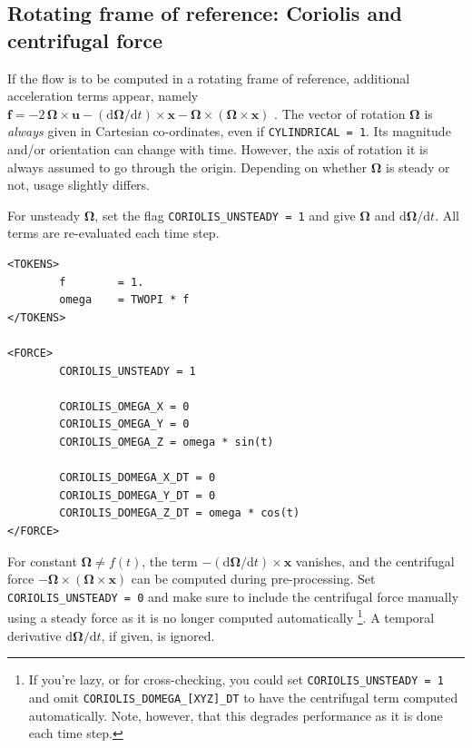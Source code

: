 \documentclass[11pt]{report}
\newcommand\cd{\mathrm{d}} \newcommand\cD{\mathrm{D}}
\begin{document}
\subsection{Rotating frame of reference: Coriolis and centrifugal force}


If the flow is to be computed in a rotating frame of reference,
additional acceleration terms appear, namely $\bm{f} = -2\,\bm{\Omega}
\times \bm{u} - (\cd\bm{\Omega}/\cd t) \times \bm{x} -\bm{\Omega}
\times (\bm{\Omega} \times \bm{x})$ \citep{bat67}. The vector
of rotation $\bm{\Omega}$ is \emph{always} given in Cartesian
co-ordinates, even if \verb|CYLINDRICAL = 1|. Its magnitude and/or
orientation can change with time. However, the axis of rotation it is
always assumed to go through the origin. Depending on whether
$\bm{\Omega}$ is steady or not, usage slightly differs.


For unsteady $\bm{\Omega}$, set the flag \verb|CORIOLIS_UNSTEADY = 1|
and give $\bm{\Omega}$ and $\cd\bm{\Omega}/\cd t$. All terms are
re-evaluated each time step.
\begin{verbatim}
<TOKENS>
        f        = 1.
        omega    = TWOPI * f
</TOKENS>

<FORCE>
        CORIOLIS_UNSTEADY = 1

        CORIOLIS_OMEGA_X = 0
        CORIOLIS_OMEGA_Y = 0
        CORIOLIS_OMEGA_Z = omega * sin(t)

        CORIOLIS_DOMEGA_X_DT = 0
        CORIOLIS_DOMEGA_Y_DT = 0
        CORIOLIS_DOMEGA_Z_DT = omega * cos(t)
</FORCE>
\end{verbatim}

\noindent 
For constant $\bm{\Omega}\neq f(t)$, the term
$-(\cd\bm{\Omega}/\cd t)\times\bm{x}$ vanishes, and the centrifugal
force $-\bm{\Omega} \times (\bm{\Omega} \times \bm{x})$ can be
computed during pre-processing.
%
Set \verb|CORIOLIS_UNSTEADY = 0| and make sure to include the centrifugal
force manually using a steady force as it is no longer computed automatically%
\footnote{If you're lazy, or for cross-checking, you could set
  \texttt{CORIOLIS\_UNSTEADY = 1} and omit
  \texttt{CORIOLIS\_DOMEGA\_[XYZ]\_DT} to have the centrifugal term
  computed automatically. Note, however, that this degrades
  performance as it is done each time step.}.  A temporal derivative
$\cd\bm{\Omega}/\cd t$, if given, is ignored.
\end{document}
